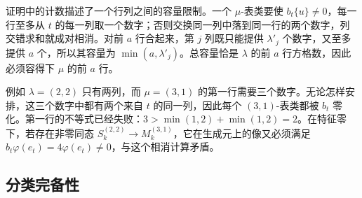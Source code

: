 证明中的计数描述了一个行列之间的容量限制。一个 \(\mu\)-表类要使 \(b_t\{u\}\ne0\)，每一行至多从 \(t\) 的每一列取一个数字；否则交换同一列中落到同一行的两个数字，列交错求和就成对相消。对前 \(a\) 行合起来，第 \(j\) 列既只能提供 \(\lambda'_j\) 个数字，又至多提供 \(a\) 个，所以其容量为 \(\min(a,\lambda'_j)\)。总容量恰是 \(\lambda\) 的前 \(a\) 行方格数，因此必须容得下 \(\mu\) 的前 \(a\) 行。

\ProseParagraphBreak
例如 \(\lambda=(2,2)\) 只有两列，而 \(\mu=(3,1)\) 的第一行需要三个数字。无论怎样安排，这三个数字中都有两个来自 \(t\) 的同一列，因此每个 \((3,1)\)-表类都被 \(b_t\) 零化。第一行的不等式已经失败：\(3>\min(1,2)+\min(1,2)=2\)。在特征零下，若存在非零同态 \(S_k^{(2,2)}\rightarrow M_k^{(3,1)}\)，它在生成元上的像又必须满足 \(b_t\varphi(e_t)=4\varphi(e_t)\ne0\)，与这个相消计算矛盾。

\subsection{分类完备性}
\label{b5:subsec:0604:03}

